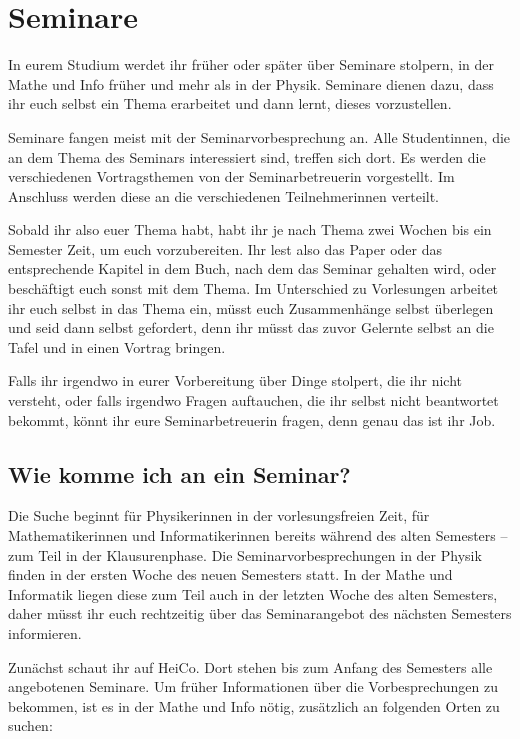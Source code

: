 \section{Seminare}

In eurem Studium werdet ihr früher oder später über Seminare stolpern, in der Mathe und Info früher und mehr als in der Physik. Seminare dienen dazu, dass ihr euch selbst ein Thema erarbeitet und dann lernt, dieses vorzustellen.

Seminare fangen meist mit der Seminarvorbesprechung an. Alle Studentinnen, die an dem Thema des Seminars interessiert sind, treffen sich dort. Es werden die verschiedenen Vortragsthemen von der Seminarbetreuerin vorgestellt. Im Anschluss werden diese an die verschiedenen Teilnehmerinnen verteilt.

Sobald ihr also euer Thema habt, habt ihr je nach Thema zwei Wochen bis ein Semester Zeit, um euch vorzubereiten. Ihr lest also das Paper oder das entsprechende Kapitel in dem Buch, nach dem das Seminar gehalten wird, oder beschäftigt euch sonst mit dem Thema. Im Unterschied zu Vorlesungen arbeitet ihr euch selbst in das Thema ein, müsst euch Zusammenhänge selbst überlegen und seid dann selbst gefordert, denn ihr müsst das zuvor Gelernte selbst an die Tafel und in einen Vortrag bringen.

Falls ihr irgendwo in eurer Vorbereitung über Dinge stolpert, die ihr nicht versteht, oder falls irgendwo Fragen auftauchen, die ihr selbst nicht beantwortet bekommt, könnt ihr eure Seminarbetreuerin fragen, denn genau das ist ihr Job.

\subsection{Wie komme ich an ein Seminar?}

Die Suche beginnt für Physikerinnen in der vorlesungsfreien Zeit, für Mathematikerinnen und Informatikerinnen bereits während des alten Semesters -- zum Teil in der Klausurenphase. Die Seminarvorbesprechungen in der Physik finden in der ersten Woche des neuen Semesters statt. In der Mathe und Informatik liegen diese zum Teil auch in der letzten Woche des alten Semesters, daher müsst ihr euch rechtzeitig über das Seminarangebot des nächsten Semesters informieren.

Zunächst schaut ihr auf HeiCo. Dort stehen bis zum Anfang des Semesters alle angebotenen Seminare. Um früher Informationen über die Vorbesprechungen zu bekommen, ist es in der Mathe und Info nötig, zusätzlich an folgenden Orten zu suchen:

